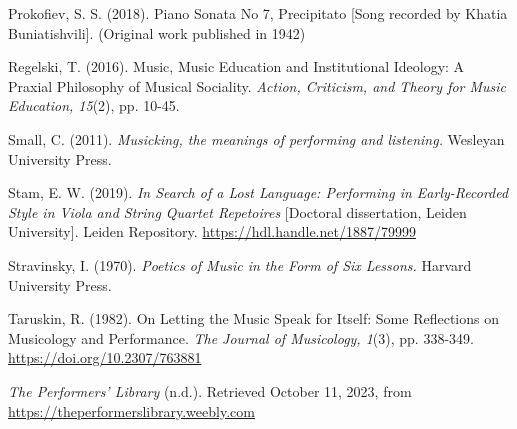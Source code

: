 \documentclass[authordate, empirical, issue]{jote-new-article}
\begin{document}
Prokofiev, S. S. (2018). Piano Sonata No 7, Precipitato [Song recorded by Khatia Buniatishvili]. (Original work published in 1942)



Regelski, T. (2016). Music, Music Education and Institutional Ideology: A Praxial Philosophy of Musical Sociality. \emph{Action, Criticism, and Theory for Music Education, 15}(2), pp. 10-45.



Small, C. (2011). \emph{Musicking, the meanings of performing and listening.} Wesleyan University Press.



Stam, E. W. (2019). \emph{In Search of a Lost Language: Performing in Early-Recorded Style in Viola and String Quartet Repetoires }[Doctoral dissertation, Leiden University]. Leiden Repository. \url{https://hdl.handle.net/1887/79999}



Stravinsky, I. (1970). \emph{Poetics of Music in the Form of Six Lessons.} Harvard University Press.



Taruskin, R. (1982). On Letting the Music Speak for Itself: Some Reflections on Musicology and Performance. \emph{The Journal of Musicology, 1}(3), pp. 338-349. \url{https://doi.org/10.2307/763881}



\emph{The Performers' Library }(n.d.). Retrieved October 11, 2023, from \url{https://theperformerslibrary.weebly.com}
\end{document}
